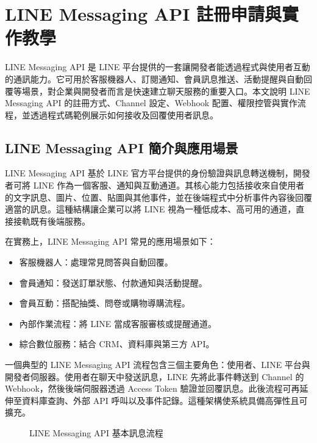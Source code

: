 \chapter{LINE Messaging API 註冊申請與實作教學}

LINE Messaging API 是 LINE 平台提供的一套讓開發者能透過程式與使用者互動的通訊能力。它可用於客服機器人、訂閱通知、會員訊息推送、活動提醒與自動回覆等場景，對企業與開發者而言是快速建立聊天服務的重要入口。本文說明 LINE Messaging API 的註冊方式、Channel 設定、Webhook 配置、權限控管與實作流程，並透過程式碼範例展示如何接收及回覆使用者訊息。

\section{LINE Messaging API 簡介與應用場景}

LINE Messaging API 基於 LINE 官方平台提供的身份驗證與訊息轉送機制，開發者可將 LINE 作為一個客服、通知與互動通道。其核心能力包括接收來自使用者的文字訊息、圖片、位置、貼圖與其他事件，並在後端程式中分析事件內容後回覆適當的訊息。這種結構讓企業可以將 LINE 視為一種低成本、高可用的通道，直接接軌既有後端服務。

在實務上，LINE Messaging API 常見的應用場景如下：
\begin{itemize}[leftmargin=2em]
    \item 客服機器人：處理常見問答與自動回覆。
    \item 會員通知：發送訂單狀態、付款通知與活動提醒。
    \item 會員互動：搭配抽獎、問卷或購物導購流程。
    \item 內部作業流程：將 LINE 當成客服審核或提醒通道。
    \item 綜合數位服務：結合 CRM、資料庫與第三方 API。
\end{itemize}

一個典型的 LINE Messaging API 流程包含三個主要角色：使用者、LINE 平台與開發者伺服器。使用者在聊天中發送訊息，LINE 先將此事件轉送到 Channel 的 Webhook，然後後端伺服器透過 Access Token 驗證並回覆訊息。此後流程可再延伸至資料庫查詢、外部 API 呼叫以及事件記錄。這種架構使系統具備高彈性且可擴充。

\begin{figure}[H]
\centering
{}
\caption{LINE Messaging API 基本訊息流程}
\end{figure}

